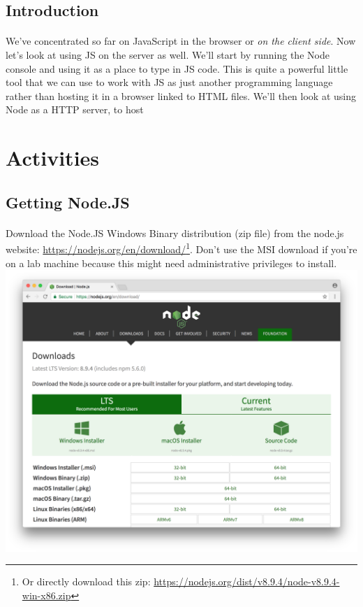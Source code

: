 \documentclass[10pt, a4paper, twosize]{article}
\begin{document}
\subsection{Introduction}
\paragraph{} We've concentrated so far on JavaScript in the browser or \emph{on the client side}. Now let's look at using JS on the server as well. We'll start by running the Node console and using it as a place to type in JS code. This is quite a powerful little tool that we can use to work with JS as just another programming language rather than hosting it in a browser linked to HTML files. We'll then look at using Node as a HTTP server, to host 

\section{Activities}

\subsection{Getting Node.JS}

\paragraph{} Download the Node.JS Windows Binary distribution (zip file) from the node.js website: \url{https://nodejs.org/en/download/}\footnote{Or directly download this zip: \url{https://nodejs.org/dist/v8.9.4/node-v8.9.4-win-x86.zip}}. Don't use the MSI download if you're on a lab machine because this might need administrative privileges to install.\\ 

\includegraphics[width=.8\textwidth]{images/node_web-download}
\end{document}
